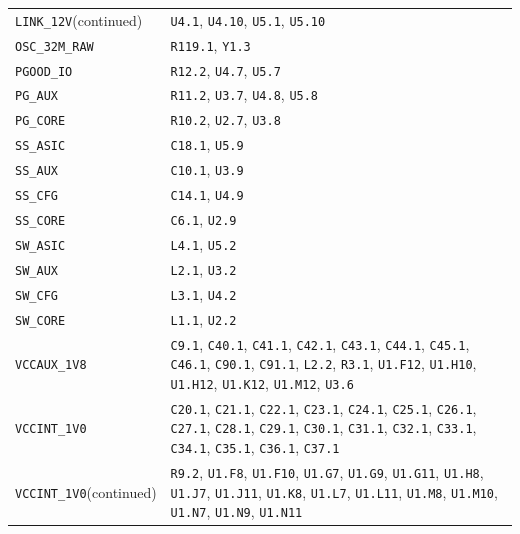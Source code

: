 \documentclass[11pt,a4paper]{article}
\begin{document}
\begin{longtable}{@{}P{49mm}P{123mm}@{}}
\nolinkurl{LINK_12V}\newline (continued) & \nolinkurl{U4.1}, \nolinkurl{U4.10}, \nolinkurl{U5.1}, \nolinkurl{U5.10} \\
\nolinkurl{OSC_32M_RAW} & \nolinkurl{R119.1}, \nolinkurl{Y1.3} \\
\nolinkurl{PGOOD_IO} & \nolinkurl{R12.2}, \nolinkurl{U4.7}, \nolinkurl{U5.7} \\
\nolinkurl{PG_AUX} & \nolinkurl{R11.2}, \nolinkurl{U3.7}, \nolinkurl{U4.8}, \nolinkurl{U5.8} \\
\nolinkurl{PG_CORE} & \nolinkurl{R10.2}, \nolinkurl{U2.7}, \nolinkurl{U3.8} \\
\nolinkurl{SS_ASIC} & \nolinkurl{C18.1}, \nolinkurl{U5.9} \\
\nolinkurl{SS_AUX} & \nolinkurl{C10.1}, \nolinkurl{U3.9} \\
\nolinkurl{SS_CFG} & \nolinkurl{C14.1}, \nolinkurl{U4.9} \\
\nolinkurl{SS_CORE} & \nolinkurl{C6.1}, \nolinkurl{U2.9} \\
\nolinkurl{SW_ASIC} & \nolinkurl{L4.1}, \nolinkurl{U5.2} \\
\nolinkurl{SW_AUX} & \nolinkurl{L2.1}, \nolinkurl{U3.2} \\
\nolinkurl{SW_CFG} & \nolinkurl{L3.1}, \nolinkurl{U4.2} \\
\nolinkurl{SW_CORE} & \nolinkurl{L1.1}, \nolinkurl{U2.2} \\
\nolinkurl{VCCAUX_1V8} & \nolinkurl{C9.1}, \nolinkurl{C40.1}, \nolinkurl{C41.1}, \nolinkurl{C42.1}, \nolinkurl{C43.1}, \nolinkurl{C44.1}, \nolinkurl{C45.1}, \nolinkurl{C46.1}, \nolinkurl{C90.1}, \nolinkurl{C91.1}, \nolinkurl{L2.2}, \nolinkurl{R3.1}, \nolinkurl{U1.F12}, \nolinkurl{U1.H10}, \nolinkurl{U1.H12}, \nolinkurl{U1.K12}, \nolinkurl{U1.M12}, \nolinkurl{U3.6} \\
\nolinkurl{VCCINT_1V0} & \nolinkurl{C20.1}, \nolinkurl{C21.1}, \nolinkurl{C22.1}, \nolinkurl{C23.1}, \nolinkurl{C24.1}, \nolinkurl{C25.1}, \nolinkurl{C26.1}, \nolinkurl{C27.1}, \nolinkurl{C28.1}, \nolinkurl{C29.1}, \nolinkurl{C30.1}, \nolinkurl{C31.1}, \nolinkurl{C32.1}, \nolinkurl{C33.1}, \nolinkurl{C34.1}, \nolinkurl{C35.1}, \nolinkurl{C36.1}, \nolinkurl{C37.1} \\
\nolinkurl{VCCINT_1V0}\newline (continued) & \nolinkurl{R9.2}, \nolinkurl{U1.F8}, \nolinkurl{U1.F10}, \nolinkurl{U1.G7}, \nolinkurl{U1.G9}, \nolinkurl{U1.G11}, \nolinkurl{U1.H8}, \nolinkurl{U1.J7}, \nolinkurl{U1.J11}, \nolinkurl{U1.K8}, \nolinkurl{U1.L7}, \nolinkurl{U1.L11}, \nolinkurl{U1.M8}, \nolinkurl{U1.M10}, \nolinkurl{U1.N7}, \nolinkurl{U1.N9}, \nolinkurl{U1.N11} \\

\end{longtable}
\end{document}

